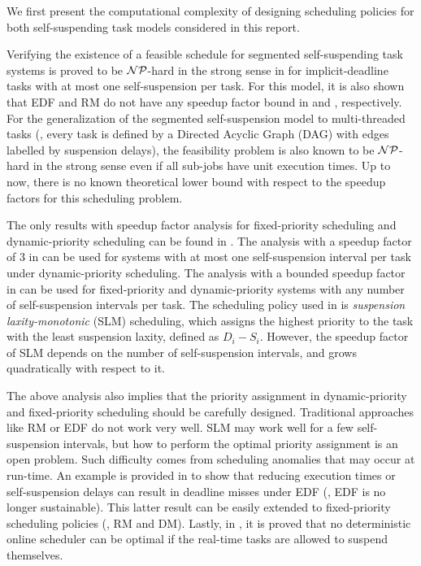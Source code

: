 \label{sec:complexity-scheduling}

We first present the computational complexity of designing scheduling policies for both self-suspending task models considered in this report.

Verifying the existence of a feasible schedule for segmented self-suspending task systems is proved to be ${\cal NP}$-hard in the strong sense in \cite{Ridouard_2004} for implicit-deadline tasks with at most one self-suspension per task. For this model, it is also shown that EDF and RM do not have any speedup factor bound in \cite{Ridouard_2004} and \cite{RTSS-ChenL14}, respectively. For the generalization of the segmented self-suspension model to multi-threaded tasks (\ie, every task is defined by a Directed Acyclic Graph (DAG) with edges labelled by suspension delays), the feasibility problem is also known to be  ${\cal NP}$-hard in the strong sense  \cite{Ric03} even if all sub-jobs have unit execution times. Up to now, there is no known theoretical lower bound with respect to the speedup factors for this scheduling problem.

 The only results with speedup factor analysis for fixed-priority scheduling and dynamic-priority scheduling can be found in \cite{RTSS-ChenL14,WC16-suspend-DATE,Bruggen16RTNS}. The analysis with a speedup factor of $3$ in \cite{RTSS-ChenL14,Bruggen16RTNS} can be used for systems with at most one self-suspension interval per task under dynamic-priority scheduling. The analysis with a bounded speedup factor in \cite{WC16-suspend-DATE} can be used for fixed-priority and dynamic-priority systems with any number of self-suspension intervals per task. 
 The scheduling policy used in \cite{WC16-suspend-DATE} is \emph{suspension laxity-monotonic} (SLM) scheduling, which assigns the highest priority to the task with the least suspension laxity, defined as $D_i-S_i$.
However, the speedup factor of SLM  depends on the number of self-suspension intervals, and grows quadratically with respect to it.



The above analysis also implies that the priority assignment in dynamic-priority and fixed-priority scheduling should be carefully designed. Traditional approaches like RM or EDF do not work very well. SLM may work well for a few self-suspension intervals, but how to perform the optimal priority assignment is an open problem. Such difficulty comes from scheduling anomalies that may occur at run-time. An example is provided in \cite{Ridouard_2004}  to show that reducing execution times or self-suspension delays can result in deadline misses under EDF (\ie, EDF is no longer sustainable). This latter result can be easily extended to fixed-priority scheduling policies (\ie, RM and DM). Lastly, in \cite{RidouardR06}, it is proved that no deterministic online scheduler can be optimal if the real-time tasks are allowed to suspend themselves.



